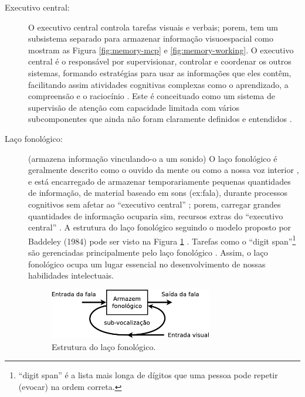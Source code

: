 \begin{description}

\item[Executivo central:]
\label{reflabel:executivocentral}
O executivo central controla tarefas visuais e verbais; 
porem, tem um subsistema separado para armazenar informação visuoespacial 
\cite[pp. 273]{braisby2012cognitive} como mostram as Figura \ref{fig:memory-mcp} e \ref{fig:memory-working}.
O executivo central  é o responsável por supervisionar, 
controlar e coordenar os outros sistemas, 
formando estratégias para usar as informações que eles contêm,
facilitando assim atividades cognitivas complexas como o aprendizado, a compreensão e o raciocínio
\cite[pp. 272]{braisby2012cognitive} \cite[pp. 678]{spreen2006compendium} \cite[pp. 126]{pake2019psicologia}.
Este é conceituado como um sistema de supervisão de atenção com capacidade limitada
\cite[pp. 272, 281]{braisby2012cognitive} \cite[pp. 678]{spreen2006compendium}
com vários subcomponentes que ainda não foram claramente definidos e entendidos
\cite[pp. 285]{braisby2012cognitive}.


\item[Laço fonológico:] (armazena informação vinculando-o a um sonido)
\label{reflabel:fonologico}
O laço fonológico é geralmente descrito como o ouvido da mente ou como a nossa voz interior \cite[pp. 122]{pake2019psicologia}, 
e está encarregado de armazenar temporariamente pequenas quantidades de informação, 
de material baseado em sons (ex:fala), durante processos cognitivos
sem afetar ao ``executivo central'' 
\cite[pp. 678]{spreen2006compendium} \cite[pp. 272]{braisby2012cognitive} \cite[pp. 122]{pake2019psicologia};
porem, carregar grandes quantidades de informação ocuparia sim, recursos extras do ``executivo central''
\cite[pp. 272]{braisby2012cognitive}.
A estrutura do laço fonológico seguindo o modelo proposto por Baddeley (1984) pode ser visto na Figura  \ref{fig:lacofonologico}
\cite[pp. 276]{braisby2012cognitive}.
Tarefas como o ``digit span''\footnote{``digit span'' é a lista mais longa de dígitos que uma 
pessoa pode repetir (evocar) na ordem correta.} são gerenciadas principalmente pelo laço fonológico 
\cite[pp. 678]{spreen2006compendium}.
Assim, o laço fonológico ocupa um lugar essencial no desenvolvimento de nossas habilidades intelectuais. 
\begin{figure}[!h]
  \centering
    \includegraphics[width=0.7\textwidth]{chapters/cap-learning/fonologico.eps}
\caption{Estrutura do laço fonológico.}
\label{fig:lacofonologico}
\end{figure}


\end{description}

